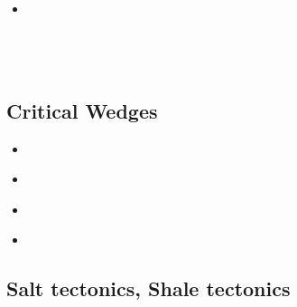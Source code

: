 \begin{scriptsize}
\begin{itemize}
\textcite{luhu21} \\
\textcite{gona21} \\
\textcite{manp21} \\
\textcite{jokd21} \\
\textcite{grrm21} \\
\item[\twothousandtwentytwo] 
\textcite{thhu22} \\
\textcite{olgr22} \\
\textcite{ludn22} \\
\textcite{rutb22} \\
\end{itemize}
\end{scriptsize}

\subsection{Critical Wedges}

\begin{scriptsize}
\begin{itemize}
\item[\nineteenninetyfour] 
\textcite{koon94}\\
\item[\twothousandsix] 
\textcite{rosw06}\\
\item[\twothousandeight] 
\textcite{rowf08}\\
\item[\twothousandthirteen] 
\textcite{cass13}\\
\end{itemize}
\end{scriptsize}

\subsection{Salt tectonics, Shale tectonics}

